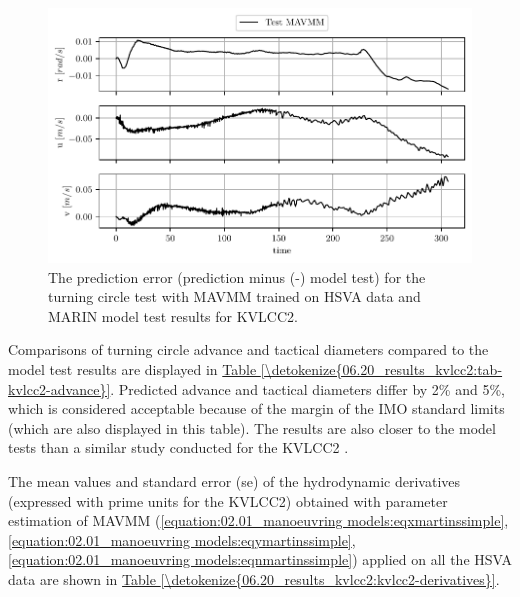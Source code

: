 \begin{figure}[h!]
\centering
\includegraphics[width=1.0\textwidth]{kappa/images/19.pdf}
\caption{The prediction error (prediction minus (-) model test) for the turning circle test with MAVMM trained on HSVA data and MARIN model test results for KVLCC2.}\label{\detokenize{06.20_results_kvlcc2:fig-kvlcc2-testing-sim-error}}\end{figure} 

Comparisons of turning circle advance and tactical diameters compared to the model test results are displayed in \hyperref[\detokenize{06.20_results_kvlcc2:tab-kvlcc2-advance}]{Table \ref{\detokenize{06.20_results_kvlcc2:tab-kvlcc2-advance}}}. Predicted advance and tactical diameters differ by 2\% and 5\%, which is considered acceptable because of the margin of the IMO standard limits (which are also displayed in this table). The results are also closer to the model tests than a similar study conducted for the KVLCC2 \cite{he_nonparametric_2022}.

\clearpage
The mean values and standard error (se) of the hydrodynamic derivatives (expressed with prime units for the KVLCC2) obtained with parameter estimation of MAVMM (\autoref{equation:02.01_manoeuvring models:eqxmartinssimple}, \autoref{equation:02.01_manoeuvring models:eqymartinssimple}, \autoref{equation:02.01_manoeuvring models:eqnmartinssimple}) applied on all the HSVA data are shown in \hyperref[\detokenize{06.20_results_kvlcc2:kvlcc2-derivatives}]{Table \ref{\detokenize{06.20_results_kvlcc2:kvlcc2-derivatives}}}.

\section*{}
\vspace{-1cm}
